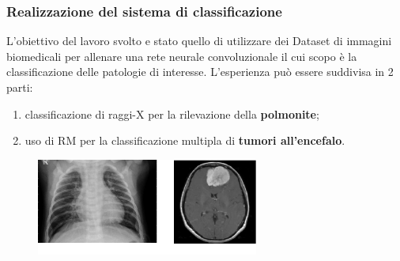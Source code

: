 \documentclass{beamer}
\begin{document}
\begin{frame}
	\frametitle{Realizzazione del sistema di classificazione}
	L’obiettivo del lavoro svolto e stato quello di utilizzare dei Dataset di immagini
	biomedicali per allenare una rete neurale convoluzionale il cui scopo è la
	classificazione delle patologie di interesse.
	L'esperienza può essere suddivisa in 2 parti:
	\begin{enumerate}
		\item classificazione di raggi-X per la rilevazione della \textbf{polmonite};
		\item uso di RM per la classificazione multipla di \textbf{tumori all'encefalo}.
	\end{enumerate}
	\begin{figure}
		\includegraphics[width=0.65\textwidth]{virus.JPEG}
		
	\end{figure}

\end{frame}
\end{document}

